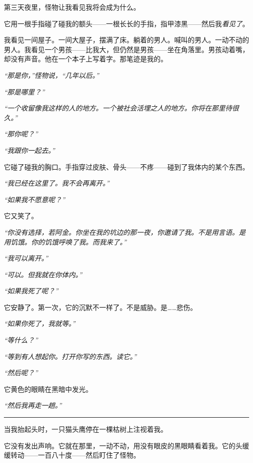 \noindent 第三天夜里，怪物让我看见我将会成为什么。

\noindent 它用一根手指碰了碰我的额头——一根长长的手指，指甲漆黑——然后我\textit{看见了}。

\noindent 我看见一间屋子。一间大屋子，摆满了床。躺着的男人。喊叫的男人。一动不动的男人。我看见一个男孩——比我大，但仍然是男孩——坐在角落里。男孩动着嘴，却没有声音。他在一个本子上写着字。那笔迹是我的。

\noindent \textit{“那是你，”怪物说，“几年以后。”}

\noindent \textit{“那是哪里？”}

\noindent \textit{“一个收留像我这样的人的地方。一个被社会活埋之人的地方。你将在那里待很久。”}

\noindent \textit{“那你呢？”}

\noindent \textit{“我跟你一起去。”}

\noindent 它碰了碰我的胸口。手指穿过皮肤、骨头——不疼——碰到了我体内的某个东西。

\noindent \textit{“我已经在这里了。我不会再离开。”}

\noindent \textit{“如果我不愿意呢？”}

\noindent 它又笑了。

\noindent \textit{“你没有选择，若阿金。你坐在我的坑边的那一夜，你邀请了我。不是用言语。是用饥饿。你的饥饿呼唤了我。而我来了。”}

\noindent \textit{“我可以离开。”}

\noindent \textit{“可以。但我就在你体内。”}

\noindent \textit{“如果我死了呢？”}

\noindent 它安静了。第一次，它的沉默不一样了。不是威胁。是……悲伤。

\noindent \textit{“如果你死了，我就等。”}

\noindent \textit{“等什么？”}

\noindent \textit{“等到有人想起你。打开你写的东西。读它。”}

\noindent \textit{“然后呢？”}

\noindent 它黄色的眼睛在黑暗中发光。

\noindent \textit{“然后我再走一趟。”}

\vspace{0.5em}\noindent\rule{\textwidth}{0.5pt}\vspace{0.5em}

\noindent 当我抬起头时，一只猫头鹰停在一棵枯树上注视着我。

\noindent 它没有发出声响。它就在那里，一动不动，用没有眼皮的黑眼睛看着我。它的头缓缓转动——一百八十度——然后盯住了怪物。

